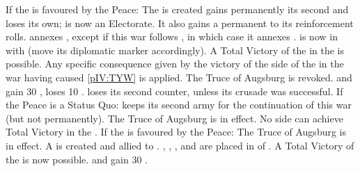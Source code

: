 \begin{digressions}


  \aparag If the \ligue is favoured by the Peace:
  \bparag The  is created 
  \bparag \paysBaviere gains permanently its second \ARMY and \paysPalatinat
  loses its own; \paysBaviere is now an Electorate.  It also gains a permanent
   to its reinforcement rolls.
  \bparag \paysBaviere annexes \provinceOberPfalz, except if this war follows
  , in which case it annexes
  \provinceSchwaben.
  \bparag \paysBaviere is now in \AM with \HAB (move its diplomatic marker
  accordingly).
  \bparag A Total Victory of the \ligue in the  is possible.
  \bparag Any specific consequence given by the victory of the side of the
  \ligue in the war having caused \ref{pIV:TYW} is applied.
  \bparag The Truce of Augsburg is revoked.
  \bparag \SPA and \AUS gain 30 \PV, \SUE loses 10 \PV.
  \bparag \DANdan loses its second \ARMY counter, unless its crusade was
  successful.
  \aparag If the Peace is a Status Quo:
  \bparag \paysBaviere keeps its second army for the continuation of this war
  (but not permanently).
  \bparag The Truce of Augsburg is in effect.
  \bparag No side can achieve Total Victory in the .
  \aparag If the \alliance is favoured by the Peace:
  \bparag The Truce of Augsburg is in effect.
  \bparag A  is created and allied to
  \HOL.
  \bparag \paysOldenburg, \paysHanovre, \paysHesse, \paysHanse and \paysBerg
  are placed in \EG of \HOL.
  \bparag A Total Victory of the \alliance is now possible.
  \bparag \HOL and \SUE gain 30 \PV.



\end{digressions}
